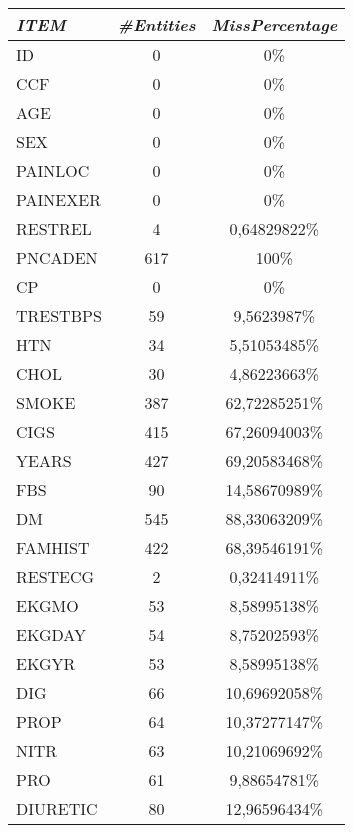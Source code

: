 \documentclass[a4paper,12pt]{article}
\begin{document}
    \begin{multicols}{2}
            \begin{tabular}{|l|c|c|} \hline

                \textit{ITEM} & \textit{\#Entities} & \textit{MissPercentage} \\
                \hline ID&  0&  0\% \\
                \hline CCF& 0&  0\% \\
                \hline AGE& 0&  0\% \\
                \hline SEX& 0&  0\% \\
                \hline PAINLOC& 0&  0\% \\
                \hline PAINEXER&    0&  0\% \\
                \hline RESTREL& 4&  0,64829822\% \\
                \hline PNCADEN& 617&    100\% \\
                \hline CP   &0& 0\% \\
                \hline TRESTBPS&    59& 9,5623987\% \\
                \hline HTN  &34&    5,51053485\% \\
                \hline CHOL &30&    4,86223663\% \\
                \hline SMOKE    &387&   62,72285251\% \\
                \hline CIGS &415&   67,26094003\% \\
                \hline YEARS    &427&   69,20583468\% \\
                \hline FBS  &90&    14,58670989\% \\
                \hline DM   &545&   88,33063209\% \\
                \hline FAMHIST& 422 &68,39546191\% \\
                \hline RESTECG& 2&  0,32414911\% \\
                \hline EKGMO    &53&    8,58995138\% \\
                \hline EKGDAY&  54& 8,75202593\% \\
                \hline EKGYR    &53&    8,58995138\% \\
                \hline DIG  &66 &10,69692058\% \\
                \hline PROP &64 &10,37277147\% \\
                \hline NITR &63 &10,21069692\% \\
                \hline PRO& 61  &9,88654781\% \\
                \hline DIURETIC &80&    12,96596434\% \\ \hline
            

\end{tabular}
\end{multicols}
\end{document}
